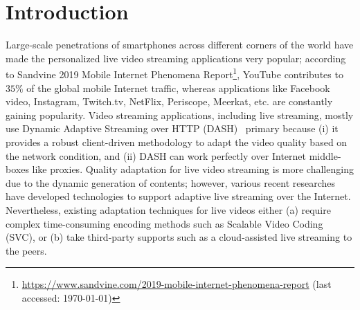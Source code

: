 \section{Introduction}
Large-scale penetrations of smartphones across different corners of the world have made the personalized live video streaming applications very popular; according to Sandvine 2019 Mobile Internet Phenomena Report\footnote{\url{https://www.sandvine.com/2019-mobile-internet-phenomena-report} (last accessed: \today)}, YouTube contributes to $35\%$ of the global mobile Internet traffic, whereas applications like Facebook video, Instagram, Twitch.tv, NetFlix, Periscope, Meerkat, etc. are constantly gaining popularity.  
Video streaming applications, including live streaming, mostly use Dynamic Adaptive Streaming over HTTP (DASH)~\cite{stockhammer2011dynamic} primary because (i) it provides a robust client-driven methodology to adapt the video quality based on the network condition, and (ii) DASH can work perfectly over Internet middle-boxes like proxies. Quality adaptation for live video streaming is more challenging due to the dynamic generation of contents; however, various recent researches~\cite{TNET-Migration-2016} have developed technologies to support adaptive live streaming over the Internet. Nevertheless, existing adaptation techniques for live videos either (a) require complex time-consuming encoding methods such as Scalable Video Coding (SVC), or (b) take third-party supports such as a cloud-assisted live streaming to the peers. 


